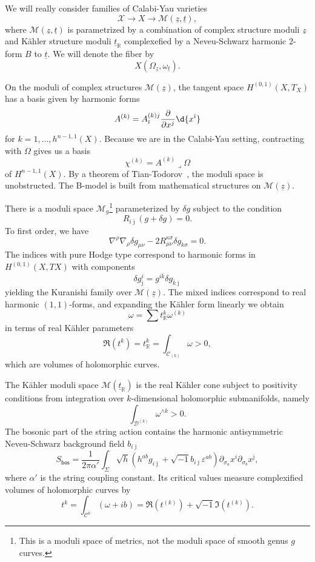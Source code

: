\documentclass[10pt]{amsart}
\theoremstyle{definition}
\theoremstyle{remark}
\theoremstyle{plain}
\theoremstyle{definition}
\theoremstyle{remark}
\newcommand{\R}{\mathbb{R}}
\newcommand{\ep}{\varepsilon}
\newcommand{\mc}[1]{\mathcal{#1}}
\newcommand{\ut}{\ul{t}}
\newcommand{\uz}{\ul{z}}
\newcommand{\ms}[1]{\mathsf{#1}}
\newcommand{\ul}[1]{\underline{#1}}
\newcommand{\1}{\mathbf{1}}
\newcommand{\2}{\mathbf{2}}
\newcommand{\3}{\mathbf{3}}
\begin{document}
We will really consider families of Calabi-Yau varieties
\[ \mc{X} \to X \to \mc{M}(\uz, \ut), \]
where $\mc{M}(\uz, \ut)$ is parametrized by a combination of complex structure moduli $\uz$ and K\"ahler structure moduli $\ut_{\R}$ complexefied by a Neveu-Schwarz harmonic $2$-form $B$ to $\ut$. We will denote the fiber by
\[ X(\Omega_{\uz}, \omega_{\ut}). \]

On the moduli of complex structures $\mc{M}(\uz)$, the tangent space $H^{(0,1)}(X,T_X)$ has a basis given by harmonic forms
\[ A^{(k)} = A_{\bar{\imath}}^{(k) j} \pdv{}{x^j} \d{x^{\bar{\imath}}} \]
for $k = 1, \ldots, h^{n-1,1}(X)$. Because we are in the Calabi-Yau setting, contracting with $\Omega$ gives us a basis
\[ \chi^{(k)} = A^{(k)} \lrcorner \Omega \]
of $H^{n-1,1}(X)$. By a theorem of Tian-Todorov~\cite{tiandef,todorovdef}, the moduli space is unobstructed. The B-model is built from mathematical structures on $\mc{M}(\uz)$.

There is a moduli space $\mc{M}_g$\footnote{This is a moduli space of metrics, not the moduli space of smooth genus $g$ curves.} parameterized by $\delta g$ subject to the condition
\[ R_{i\bar{\jmath}} (g+\delta g) = 0. \]
To first order, we have
\[ \nabla^{\rho} \nabla_{\rho} \delta g_{\mu\nu} - 2 R_{\mu\nu}^{\kappa\sigma} \delta g_{k\sigma} = 0. \]
The indices with pure Hodge type correspond to harmonic forms in $H^{(0,1)}(X, TX)$ with components
\[ \delta g_{\bar{\jmath}}^{i} = g^{i\bar{k}} \delta g_{\bar{k}\bar{\jmath}}  \]
yielding the Kuranishi family over $\mc{M}(\uz)$.
The mixed indices correspond to real harmonic $(1,1)$-forms, and expanding the K\"ahler form linearly we obtain
\[ \omega = \sum t_{\R}^k \omega^{(k)} \]
in terms of real K\"ahler parameters
\[  \Re(t^k) = t_{\R}^k = \int_{\mc{C}_{(k)}} \omega > 0, \] which are volumes of holomorphic curves.

The K\"ahler moduli space $\mc{M}(\ut_{\R})$ is the real K\"ahler cone subject to positivity conditions from integration over $k$-dimensional holomorphic submanifolds, namely
\[ \int_{\mc{D}^{(k)}} \omega^{\wedge k} > 0. \]
The bosonic part of the string action contains the harmonic antisymmetric Neveu-Schwarz background field $b_{i\bar{\jmath}}$
\[ S_{\ms{bos}} =\frac{1}{2\pi\alpha'} \int_{\Sigma} \sqrt{h} (h^{ab} g_{i\bar{\jmath}} + \sqrt{-1} b_{i\bar{\jmath}}\ep^{ab}) \partial_{\sigma_a} x^i \partial_{\sigma_b} x^{ \bar{\jmath} }, \]
where $\alpha'$ is the string coupling constant. Its critical values measure complexified volumes of holomorphic curves by
\[ t^k = \int_{\mc{C}^k} (\omega + ib) = \Re(t^(k)) + \sqrt{-1} \Im(t^{(k)}). \]
\end{document}
